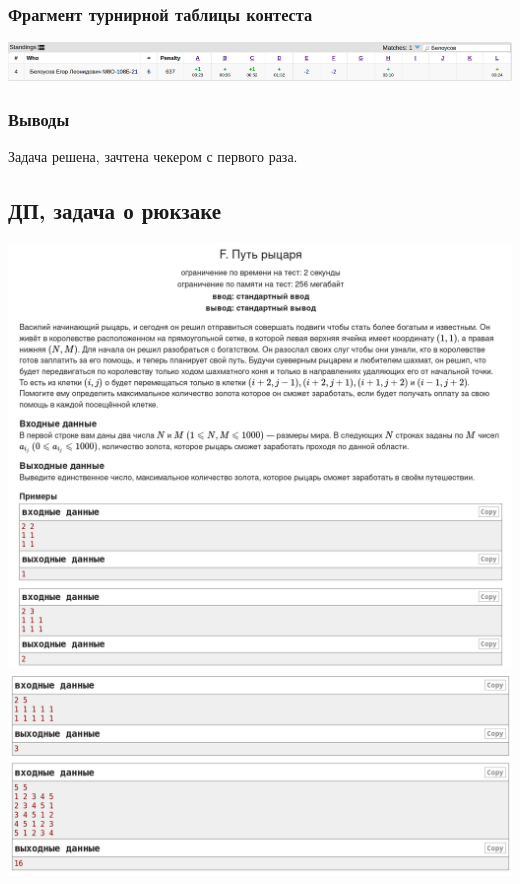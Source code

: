 \subsubsection*{Фрагмент турнирной таблицы контеста}
\begin{center}
\includegraphics[width=\textwidth]{standings/20220704/table.png}\newline\noindent
\end{center}

\subsubsection*{Выводы}

Задача решена, зачтена чекером с первого раза.

\pagebreak

\subsection*{ДП, задача о рюкзаке}
\begin{center}
\includegraphics[width=\textwidth]{statements/20220705/F1.png}
\includegraphics[width=\textwidth]{statements/20220705/F2.png}
\end{center}
